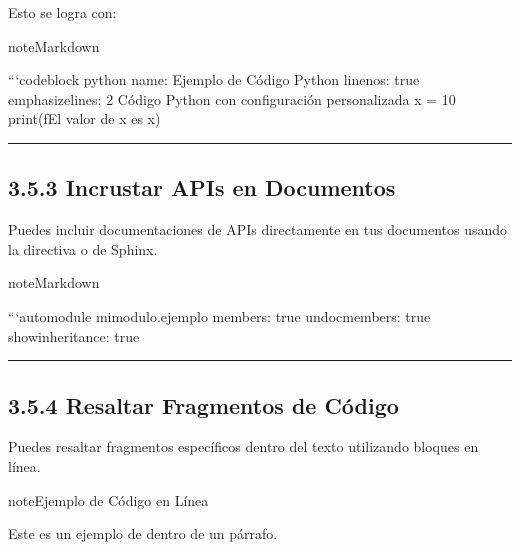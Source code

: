 \documentclass[a4paper,10pt,spanish]{sphinxmanual}
\begin{document}
\sphinxAtStartPar
Esto se logra con:

\begin{sphinxadmonition}{note}{Markdown}

\begin{sphinxVerbatim}[commandchars=\\\{\}]
```\PYGZob{}code\PYGZhy{}block\PYGZcb{} python
\PYGZhy{}\PYGZhy{}\PYGZhy{}
name: Ejemplo de Código Python
linenos: true
emphasize\PYGZhy{}lines: 2
\PYGZhy{}\PYGZhy{}\PYGZhy{}
\PYGZsh{} Código Python con configuración personalizada
x = 10
print(f\PYGZdq{}El valor de x es \PYGZob{}x\PYGZcb{}\PYGZdq{})
\end{sphinxVerbatim}
\end{sphinxadmonition}


\bigskip\hrule\bigskip



\subsection{3.5.3 Incrustar APIs en Documentos}
\label{\detokenize{3_guia_myst/code_api:incrustar-apis-en-documentos}}
\sphinxAtStartPar
Puedes incluir documentaciones de APIs directamente en tus documentos usando la directiva  o  de Sphinx.

\begin{sphinxadmonition}{note}{Markdown}

\begin{sphinxVerbatim}[commandchars=\\\{\}]
```\PYGZob{}automodule\PYGZcb{} mi\PYGZus{}modulo.ejemplo
\PYGZhy{}\PYGZhy{}\PYGZhy{}
members: true
undoc\PYGZhy{}members: true
show\PYGZhy{}inheritance: true
\PYGZhy{}\PYGZhy{}\PYGZhy{}
\end{sphinxVerbatim}
\end{sphinxadmonition}


\bigskip\hrule\bigskip



\subsection{3.5.4 Resaltar Fragmentos de Código}
\label{\detokenize{3_guia_myst/code_api:resaltar-fragmentos-de-codigo}}
\sphinxAtStartPar
Puedes resaltar fragmentos específicos dentro del texto utilizando bloques en línea.

\begin{sphinxadmonition}{note}{Ejemplo de Código en Línea}

\sphinxAtStartPar
Este es un ejemplo de  dentro de un párrafo.
\end{sphinxadmonition}
\end{document}
